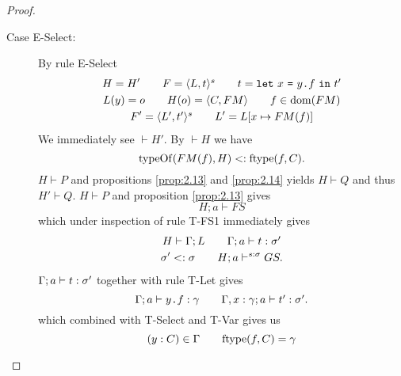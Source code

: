 \begin{proof}
\begin{description}
\begin{description}
\begin{description}
            \item[Case {\sc E-Select}:] By rule {\sc E-Select}
              \begin{equation} \label{eq:eselect1}
                \begin{gathered}
                  H = H' \quad\quad F = \mbox{$\langle L, t \rangle^s$} \quad\quad t =
                  \mbox{\mdseries\texttt{let}~$x$~\texttt{=}~$\mbox{\mdseries$y$\texttt{.}$f$}$~\texttt{in}~$t'$} \\
                  L(y) = o \quad\quad H(o) = \mbox{$\langle C, FM \rangle$} \quad\quad f \in \mbox{$\mathrm{dom}$}(FM)
                  \\
                  F' = \mbox{$\langle L', t' \rangle^s$} \quad\quad L' = L[x \mapsto FM(f)]
                \end{gathered}
              \end{equation}
              We immediately see $\vdash H'$. By $\vdash H$ we have
              \begin{equation} \label{eq:eselect2}
                \mbox{$\mathrm{typeOf}$}(FM(f), H) <: \mbox{$\mathrm{ftype}$}(f, C).
              \end{equation}
              $H \vdash P$ and propositions \ref{prop:2.13} and \ref{prop:2.14} yields
              $H \vdash Q$ and thus $H' \vdash Q$.
              $H \vdash P$ and proposition \ref{prop:2.13} gives 
              \begin{equation} \label{eq:eselect3}
                H; a \vdash FS
              \end{equation}
              which under inspection of rule {\sc T-FS1} immediately gives
              \begin{equation} \label{eq:eselect4}
                \begin{gathered}
                  H \vdash \Gamma; L \quad\quad \mbox{$\Gamma;a\vdash t:\sigma'$} \\
                  \sigma' <: \sigma \quad\quad H; a \vdash^{s: \sigma} GS.
                \end{gathered}
              \end{equation}
              $\mbox{$\Gamma;a\vdash t:\sigma'$}$ together with rule {\sc T-Let}
              gives
              \begin{equation} \label{eq:eselect5}
                \mbox{$\Gamma;a\vdash\mbox{\mdseries$y$\texttt{.}$f$}:\gamma$} \quad\quad
                \mbox{$\Gamma, x: \gamma;a\vdash t':\sigma'$}.
              \end{equation}
              which combined with {\sc T-Select} and {\sc T-Var} gives us
              \begin{equation} \label{eq:eselect6}
                (y: C) \in \Gamma \andalso \ftype(f, C) = \gamma

\end{equation}
\end{description}
\end{description}
\end{description}
\end{proof}
